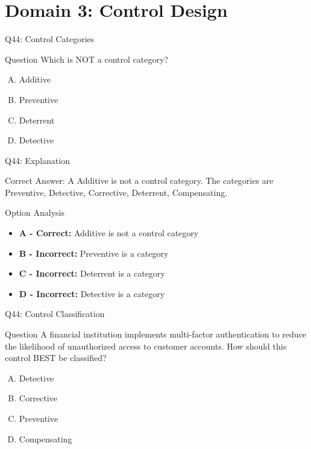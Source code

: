 \documentclass{beamer}
\begin{document}
	\section{Domain 3: Control Design}
	
	\begin{frame}{Q44: Control Categories}
		\begin{block}{Question}
			Which is NOT a control category?
		\end{block}
		\begin{enumerate}[(A)]
			\item Additive
			\item Preventive
			\item Deterrent
			\item Detective
		\end{enumerate}
	\end{frame}
	
	\begin{frame}{Q44: Explanation}
		\begin{block}{Correct Answer: A}
			Additive is not a control category. The categories are Preventive, Detective, Corrective, Deterrent, Compensating.
		\end{block}
		\begin{block}{Option Analysis}
			\begin{itemize}
				\item \textbf{A - Correct:} Additive is not a control category
				\item \textbf{B - Incorrect:} Preventive is a category
				\item \textbf{C - Incorrect:} Deterrent is a category
				\item \textbf{D - Incorrect:} Detective is a category
			\end{itemize}
		\end{block}
	\end{frame}
	
	
	\begin{frame}{Q44: Control Classification} \begin{block}{Question} A financial institution implements multi-factor authentication to reduce the likelihood of unauthorized access to customer accounts. How should this control BEST be classified? \end{block} \begin{enumerate}[(A)] \item Detective \item Corrective \item Preventive \item Compensating \end{enumerate} \end{frame} 
	
\end{document}
